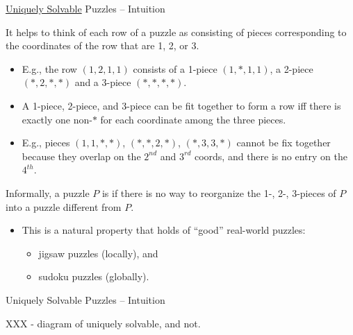 \documentclass[t,10pt,
mathserif,xcolor=dvipsnames]{beamer}
\begin{document}
\begin{myframe}{\uline{Uniquely Solvable} Puzzles -- Intuition}
  
  It helps to think of each row of a puzzle as consisting of
   pieces corresponding to the coordinates of the row
  that are 1, 2, or 3.


  \begin{itemize}
  \item E.g., the row $(1, 2, 1, 1)$ consists of a 1-piece $(1, *, 1,
    1)$, a 2-piece $(*, 2, *, *)$ and a 3-piece $(*, *, *, *)$.
    
  \item A 1-piece, 2-piece, and 3-piece can be fit together to form a
    row iff there is exactly one non-$*$ for each coordinate among the
    three pieces.
  
  \item E.g., pieces $(1, 1, *, *)$, $(*, *, 2, *)$, $(*, 3, 3, *)$
    cannot be fix together because they overlap on the $2^{nd}$ and
    $3^{rd}$ coords, and there is no entry on the $4^{th}$.

  \end{itemize}

  Informally, a puzzle $P$ is \emph{} if
  there is no way to reorganize the 1-, 2-, 3-pieces of $P$ into a
  puzzle different from $P$.

  \begin{itemize}
  \item This is a natural property that holds of ``good'' real-world puzzles:
    \begin{itemize}
    \item jigsaw puzzles (locally), and
    \item sudoku puzzles (globally).
    \end{itemize}
  \end{itemize}
  
\end{myframe}


\begin{myframe}{Uniquely Solvable Puzzles -- Intuition}

  XXX - diagram of uniquely solvable, and not.
  
\end{myframe}
\end{document}
